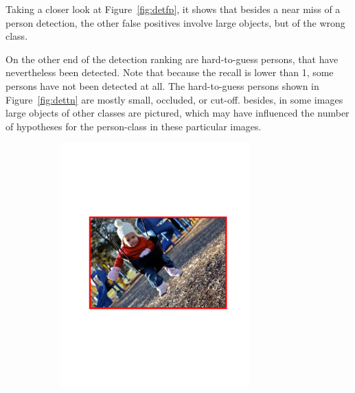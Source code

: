 Taking a closer look at Figure~\ref{fig:detfp}, it shows that besides a near miss of a person detection, the other false positives involve large objects, but of the wrong class.

On the other end of the detection ranking are hard-to-guess persons, that have nevertheless been detected. Note that because the recall is lower than 1, some persons have not been detected at all. The hard-to-guess persons shown in Figure~\ref{fig:dettn} are mostly small, occluded, or cut-off. besides, in some images large objects of other classes are pictured, which may have influenced the number of hypotheses for the person-class in these particular images.

\begin{figure}[hbt]
    \centering
    \begin{subfigure}[b]{0.37\textwidth}
        \centering
        \includegraphics[width=0.8\textwidth]{FP1}
        \caption{}
        \label{fig:detfp1}
    \end{subfigure}
    ~
    \begin{subfigure}[b]{0.37\textwidth}
        \centering

\end{subfigure}
\end{figure}
